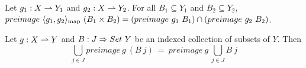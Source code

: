 \begin{lemma}
\label{lem:preimage-under-pairing}
Let $g_1 : X \rightharpoonup Y_1$ and $g_2 : X \rightharpoonup Y_2$.
For all $B_1 \subseteq Y_1$ and $B_2 \subseteq Y_2$, $preimage~\langle{g_1,g_2}\rangle_\mathrm{map}~(B_1 \times B_2) = (preimage~g_1~B_1) \cap (preimage~g_2~B_2)$.%
\end{lemma}

\begin{lemma}
\label{lem:preimage-distributes-over-union}
Let $g : X \rightharpoonup Y$ and $B : J \Rightarrow Set~Y$ be an indexed collection of subsets of $Y$.
Then
\begin{equation}
	\bigcup_{j \in J} preimage~g~(B~j)\ =\ preimage~g~\bigcup_{j \in J} B~j
\end{equation}
\end{lemma}


